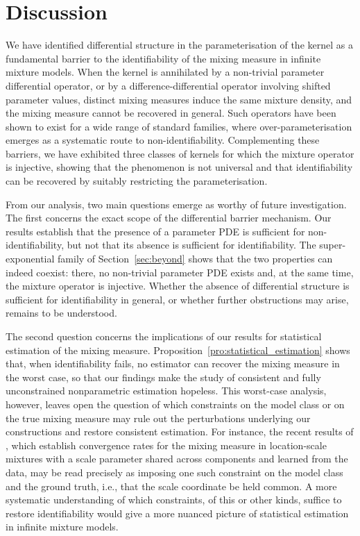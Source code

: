 \documentclass[11pt,twoside]{article} %
\begin{document}
\section{Discussion}\label{sec:discussion}

We have identified differential structure in the parameterisation of the kernel
as a fundamental barrier to the identifiability of the mixing measure in
infinite mixture models. When the kernel is annihilated by a non-trivial
parameter differential operator, or by a difference-differential operator
involving shifted parameter values, distinct mixing measures induce the same
mixture density, and the mixing measure cannot be recovered in general. Such operators have been shown to exist for a wide range of standard
families, where over-parameterisation emerges as a
systematic route to non-identifiability. Complementing these barriers, we have
exhibited three classes of kernels for which the mixture operator is injective,
showing that the phenomenon is not universal and that identifiability can be
recovered by suitably restricting the parameterisation.

From our analysis, two main questions emerge as worthy of future
investigation. The first concerns the exact scope of the differential barrier
mechanism. Our results establish that the presence of a parameter PDE is
sufficient for non-identifiability, but not that its absence is sufficient for
identifiability. The super-exponential family of Section~\ref{sec:beyond} shows
that the two properties can indeed coexist: there, no non-trivial parameter PDE
exists and, at the same time, the mixture operator is injective. Whether the absence of
differential structure is sufficient for identifiability in general, or whether
further obstructions may arise, remains to be understood.

The second question concerns the implications of our results for statistical
estimation of the mixing measure. Proposition~\ref{pro:statistical_estimation}
shows that, when identifiability fails, no estimator can recover the mixing
measure in the worst case, so that our findings make the study of consistent and fully unconstrained nonparametric estimation hopeless. This worst-case analysis,
however, leaves open the question of which constraints on the model class or on
the true mixing measure may rule out the perturbations underlying our
constructions and restore consistent estimation. For instance, the recent
results of \cite{bariletto2026convergence}, which establish convergence rates
for the mixing measure in location-scale mixtures with a scale parameter shared
across components and learned from the data, may be read precisely as imposing one such constraint on the
model class and the ground truth, i.e., that the scale coordinate be held common. A more systematic understanding of which constraints, of this or other
kinds, suffice to restore identifiability would give a more nuanced picture of statistical estimation in infinite mixture models.
\end{document}
